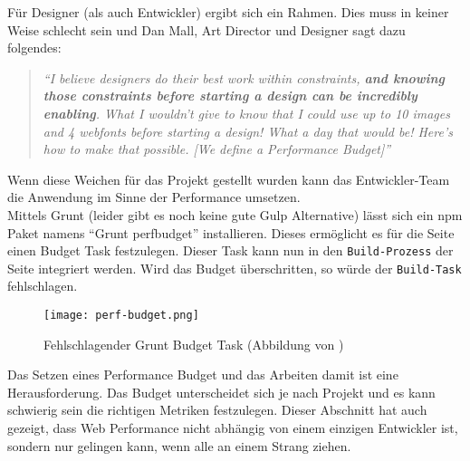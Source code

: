 			\pagebreak

			Für Designer (als auch Entwickler) ergibt sich ein Rahmen. Dies muss in keiner Weise schlecht sein und Dan Mall, Art Director und Designer sagt dazu folgendes:

			\begin{quote}
				\textit{"`I believe designers do their best work within constraints, \textbf{and knowing those constraints before starting a design can be incredibly enabling}. What I wouldn’t give to know that I could use up to 10 images and 4 webfonts before starting a design! What a day that would be! Here’s how to make that possible. [We define a Performance Budget]"'}\autocite{mall14}
			\end{quote}

			Wenn diese Weichen für das Projekt gestellt wurden kann das Entwickler-Team die Anwendung im Sinne der Performance umsetzen.\\
			Mittels Grunt (leider gibt es noch keine gute Gulp Alternative) lässt sich ein npm Paket namens "`Grunt perfbudget"' installieren. Dieses ermöglicht es für die Seite einen Budget Task festzulegen. Dieser Task kann nun in den \texttt{Build-Prozess} der Seite integriert werden. Wird das Budget überschritten, so würde der \texttt{Build-Task} fehlschlagen.

			\begin{figure}[htbp]
				\begin{center}
					\texttt{[image: perf-budget.png]}
					\caption{Fehlschlagender Grunt Budget Task (Abbildung von \autocite{farman14})}
					\label{fig:perf-budget}
				\end{center}
			\end{figure}
		
		Das Setzen eines Performance Budget und das Arbeiten damit ist eine Herausforderung. Das Budget unterscheidet sich je nach Projekt und es kann schwierig sein die richtigen Metriken festzulegen. Dieser Abschnitt hat auch gezeigt, dass Web Performance nicht abhängig von einem einzigen Entwickler ist, sondern nur gelingen kann, wenn alle an einem Strang ziehen.	


\pagebreak
%
%
